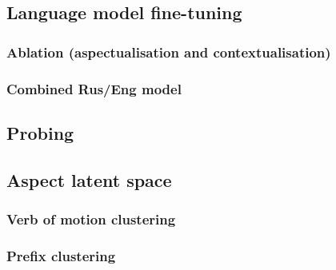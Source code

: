 \subsection{Language model fine-tuning}
\subsubsection{Ablation (aspectualisation and contextualisation)}
\subsubsection{Combined Rus/Eng model}
\subsection{Probing}
\subsection{Aspect latent space}
\subsubsection{Verb of motion clustering}
\subsubsection{Prefix clustering}